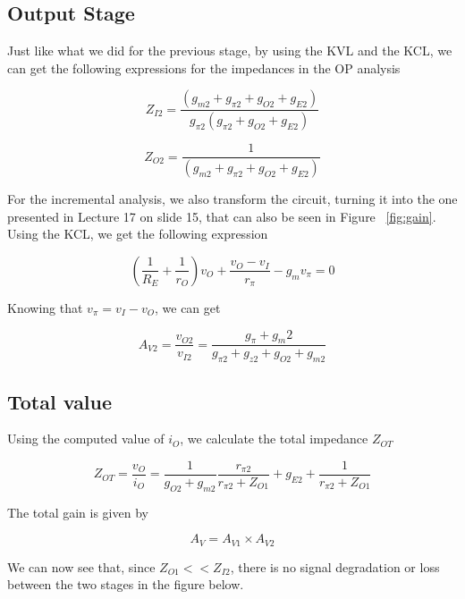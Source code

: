 \subsection{Output Stage}
Just like what we did for the previous stage, by using the KVL and the KCL, we can get the following expressions for the impedances in the OP analysis

\begin{equation}
Z_{I2} = \frac{(g_{m2}+g_{\pi 2}+g_{O2}+g_{E2})}{g_{\pi 2}(g_{\pi 2}+g_{O2}+g_{E2})}
\label{eq:1.6}
\end{equation}

\begin{equation}
Z_{O2} = \frac{1}{(g_{m2}+g_{\pi 2}+g_{O2}+g_{E2})}
\label{eq:1.7}
\end{equation}

For the incremental analysis, we also transform the circuit, turning it into the one presented in Lecture 17 on slide 15, that can also be seen in Figure ~\ref{fig:gain}. Using the KCL, we get the following expression

\begin{equation}
(\frac{1}{R_E}+\frac{1}{r_O})v_O+\frac{v_O-v_I}{r_\pi}-g_mv_\pi = 0
\label{eq:1.8}
\end{equation}

Knowing that $v_\pi = v_I - v_O$, we can get

\begin{equation}
A_{V2} = \frac{v_{O2}}{v_{I2}} = \frac{g_\pi+g_m2}{g_{\pi 2}+g_{z2}+g_{O2}+g_{m2}}
\label{eq:1.9}
\end{equation}

\subsection{Total value}
Using the computed value of $i_O$, we calculate the total impedance $Z_{OT}$

\begin{equation}
Z_{OT} = \frac{v_O}{i_O} = \frac{1}{g_{O2}+g_{m2}}\frac{r_{\pi 2}}{r_{\pi 2} + Z_{O1}}+g_{E2}+\frac{1}{r_{\pi 2} + Z_{O1}}
\label{eq:1.10}
\end{equation}

The total gain is given by

\begin{equation}
A_V = A_{V1} \times A_{V2}
\label{eq:1.11}
\end{equation}

We can now see that, since $Z_{O1}<<Z_{I2}$, there is no signal degradation or loss between the two stages in the figure below.

